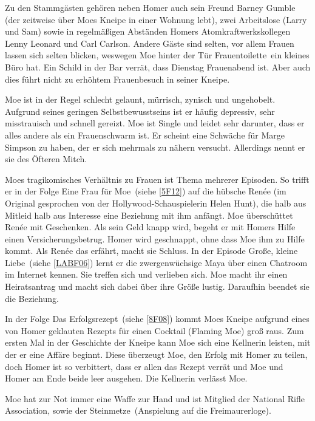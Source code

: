 {Zu den Stammgästen gehören neben Homer auch sein Freund Barney Gumble (der zeitweise über Moes Kneipe in einer Wohnung lebt), zwei Arbeitslose (Larry und Sam) sowie in regelmäßigen Abständen Homers Atomkraftwerkskollegen Lenny Leonard und Carl Carlson. Andere Gäste sind selten, vor allem Frauen lassen sich selten blicken, weswegen Moe hinter der Tür \glqq Frauentoilette\grqq\ ein kleines Büro hat. Ein Schild in der Bar verrät, dass Dienstag Frauenabend ist. Aber auch dies führt nicht zu erhöhtem Frauenbesuch in seiner Kneipe.

Moe ist in der Regel schlecht gelaunt, mürrisch, zynisch und ungehobelt. Aufgrund seines geringen Selbstbewusstseins ist er häufig depressiv, sehr misstrauisch und schnell gereizt. Moe ist Single und leidet sehr darunter, dass er alles andere als ein Frauenschwarm ist. Er scheint eine Schwäche für Marge Simpson zu haben, der er sich mehrmals zu nähern versucht. Allerdings nennt er sie des Öfteren Mitch.

Moes tragikomisches Verhältnis zu Frauen ist Thema mehrerer Episoden. So trifft er in der Folge \glqq Eine Frau für Moe\grqq\ (siehe \ref{5F12}) auf die hübsche Renée (im Original gesprochen von der Hollywood-Schauspielerin Helen Hunt), die halb aus Mitleid halb aus Interesse eine Beziehung mit ihm anfängt. Moe überschüttet Renée mit Geschenken. Als sein Geld knapp wird, begeht er mit Homers Hilfe einen Versicherungsbetrug. Homer wird geschnappt, ohne dass Moe ihm zu Hilfe kommt. Als Renée das erfährt, macht sie Schluss. In der Episode \glqq Große, kleine Liebe\grqq\ (siehe \ref{LABF06}) lernt er die zwergenwüchsige Maya über einen Chatroom im Internet kennen. Sie treffen sich und verlieben sich. Moe macht ihr einen Heiratsantrag und macht sich dabei über ihre Größe lustig. Daraufhin beendet sie die Beziehung.

In der Folge \glqq Das Erfolgsrezept\grqq\ (siehe \ref{8F08}) kommt Moes Kneipe aufgrund eines von Homer geklauten Rezepts für einen Cocktail (\glqq Flaming Moe\grqq ) groß raus. Zum ersten Mal in der Geschichte der Kneipe kann Moe sich eine Kellnerin leisten, mit der er eine Affäre beginnt. Diese überzeugt Moe, den Erfolg mit Homer zu teilen, doch Homer ist so verbittert, dass er allen das Rezept verrät und Moe und Homer am Ende beide leer ausgehen. Die Kellnerin verlässt Moe.

Moe hat zur Not immer eine Waffe zur Hand und ist Mitglied der National Rifle Association, sowie der \glqq Steinmetze\grqq\ (Anspielung auf die Freimaurerloge).

}

